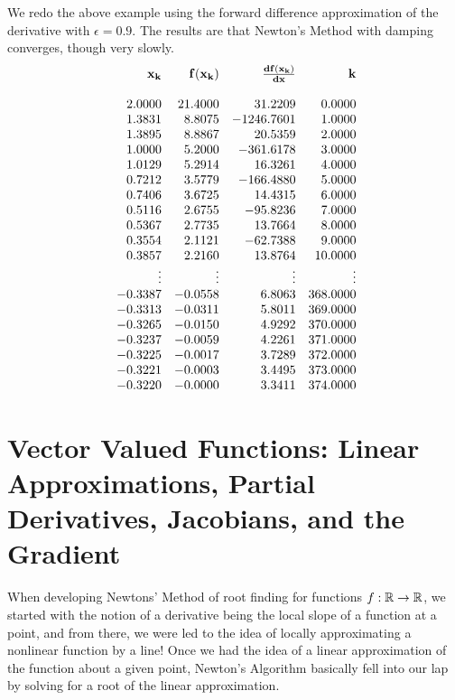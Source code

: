 \begin{remark} We redo the above example using the forward difference approximation of the derivative with $\epsilon = 0.9$. The results are that Newton's Method with damping converges, though very slowly.
$$
\begin{array}{rrrr}
{\bf x_k} & {\bf f(x_k) } &   {\bf \frac{df(x_k)}{dx}} &  {\bf k} \\
\\
2.0000 & 21.4000 & 31.2209 & 0.0000 \\
1.3831 & 8.8075 & -1246.7601 & 1.0000 \\
1.3895 & 8.8867 & 20.5359 & 2.0000 \\
1.0000 & 5.2000 & -361.6178 & 3.0000 \\
1.0129 & 5.2914 & 16.3261 & 4.0000 \\
0.7212 & 3.5779 & -166.4880 & 5.0000 \\
0.7406 & 3.6725 & 14.4315 & 6.0000 \\
0.5116 & 2.6755 & -95.8236 & 7.0000 \\
0.5367 & 2.7735 & 13.7664 & 8.0000 \\
0.3554 & 2.1121 & -62.7388 & 9.0000 \\
0.3857 & 2.2160 & 13.8764 & 10.0000 \\
\vdots & \vdots & \vdots & \vdots \\\
-0.3387 & -0.0558 & 6.8063 & 368.0000 \\
-0.3313 & -0.0311 & 5.8011 & 369.0000 \\
-0.3265 & -0.0150 & 4.9292 & 370.0000 \\
-0.3237 & -0.0059 & 4.2261 & 371.0000 \\
-0.3225 & -0.0017 & 3.7289 & 372.0000 \\
-0.3221 & -0.0003 & 3.4495 & 373.0000 \\
-0.3220 & -0.0000 & 3.3411 & 374.0000 \\
\end{array}
$$
    
\end{remark}


\section{Vector Valued Functions: Linear Approximations, Partial Derivatives, Jacobians, and the Gradient}
\label{sec:LinApproxPartialDerivJacobianGrad}

When developing Newtons' Method of root finding for functions $f:\mathbb R \to \mathbb R$, we started with the notion of a derivative being the local slope of a function at a point, and from there, we were led to the idea of locally approximating a nonlinear function by a line! Once we had the idea of a linear approximation of the function about a given point, Newton's Algorithm basically fell into our lap by solving for a root of the linear approximation. \\

